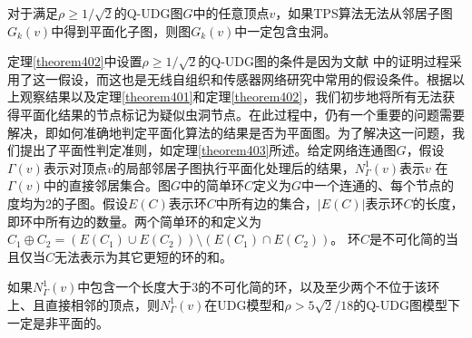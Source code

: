 \begin{theorem}
  \label{theorem402}
对于满足$\rho\ge1/\sqrt{2}$的Q-UDG图$G$中的任意顶点$v$，如果TPS算法无法从邻居子图$G_k(v)$中得到平面化子图，则图$G_k(v)$中一定包含虫洞。
\end{theorem}

定理\ref{theorem402}中设置$\rho\ge1/\sqrt{2}$的Q-UDG图的条件是因为文献 中的证明过程采用了这一假设，而这也是无线自组织和传感器网络研究中常用的假设条件。根据以上观察结果以及定理\ref{theorem401}和定理\ref{theorem402}，我们初步地将所有无法获得平面化结果的节点标记为疑似虫洞节点。在此过程中，仍有一个重要的问题需要解决，即如何准确地判定平面化算法的结果是否为平面图。为了解决这一问题，我们提出了平面性判定准则，如定理\ref{theorem403}所述。给定网络连通图$G$，假设$\Gamma(v)$表示对顶点$v$的局部邻居子图执行平面化处理后的结果，$N_{\Gamma}^1(v)$表示$v$ 在$\Gamma(v)$中的直接邻居集合。图$G$中的简单环$C$定义为$G$中一个连通的、每个节点的度均为2的子图。假设$E(C)$表示环$C$中所有边的集合，$|E(C)|$表示环$C$的长度，即环中所有边的数量。两个简单环的和定义为$C_1\oplus{C_2}=(E(C_1)\cup{E(C_2)})\setminus(E(C_1)\cap{E(C_2)})$。 环$C$是不可化简的当且仅当$C$无法表示为其它更短的环的和。
\begin{theorem}
  \label{theorem403}
如果$N_{\Gamma}^1(v)$中包含一个长度大于3的不可化简的环，以及至少两个不位于该环上、且直接相邻的顶点，则$N_{\Gamma}^1(v)$在UDG模型和$\rho>5\sqrt{2}/18$的Q-UDG图模型下一定是非平面的。
\end{theorem}

